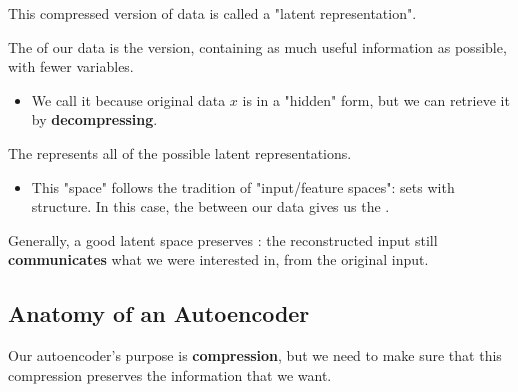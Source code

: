         This compressed version of data is called a "latent representation".\\

        \begin{definition}
            The  of our data is the  version, containing as much useful information as possible, with fewer variables.

            \begin{itemize}
                \item We call it  because original data $x$ is in a "hidden" form, but we can retrieve it by \textbf{decompressing}.
            \end{itemize}
            

            \subsecdiv

            The  represents all of the possible latent representations.
            \begin{itemize}
                \item This "space" follows the tradition of "input/feature spaces": sets with structure. In this case, the  between our data gives us the .
            \end{itemize}

            Generally, a good latent space preserves : the reconstructed input still \textbf{communicates} what we were interested in, from the original input.
            
        \end{definition}

    \subsection{Anatomy of an Autoencoder}

        Our autoencoder's purpose is \textbf{compression}, but we need to make sure that this compression preserves the information that we want.\\

